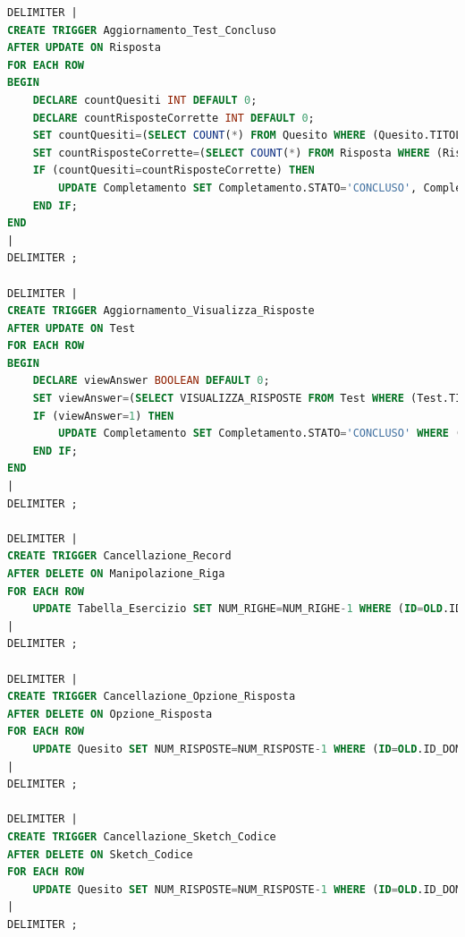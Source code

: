 \documentclass{article}
\begin{document}
\begin{lstlisting}[language=SQL, title=Codice SQL completo dei trigger dello schema della basi di dati.]
DELIMITER |
CREATE TRIGGER Aggiornamento_Test_Concluso
AFTER UPDATE ON Risposta
FOR EACH ROW
BEGIN
    DECLARE countQuesiti INT DEFAULT 0;
    DECLARE countRisposteCorrette INT DEFAULT 0;
    SET countQuesiti=(SELECT COUNT(*) FROM Quesito WHERE (Quesito.TITOLO_TEST=NEW.TITOLO_TEST));
    SET countRisposteCorrette=(SELECT COUNT(*) FROM Risposta WHERE (Risposta.TITOLO_TEST=NEW.TITOLO_TEST) AND (Risposta.EMAIL_STUDENTE=NEW.EMAIL_STUDENTE) AND (Risposta.ESITO=1));
    IF (countQuesiti=countRisposteCorrette) THEN 
        UPDATE Completamento SET Completamento.STATO='CONCLUSO', Completamento.DATA_ULTIMARISPOSTA=NOW() WHERE (Completamento.TITOLO_TEST=NEW.TITOLO_TEST) AND (Completamento.EMAIL_STUDENTE=NEW.EMAIL_STUDENTE);
    END IF; 
END
|
DELIMITER ;

DELIMITER |
CREATE TRIGGER Aggiornamento_Visualizza_Risposte
AFTER UPDATE ON Test
FOR EACH ROW
BEGIN
    DECLARE viewAnswer BOOLEAN DEFAULT 0;
    SET viewAnswer=(SELECT VISUALIZZA_RISPOSTE FROM Test WHERE (Test.TITOLO=NEW.TITOLO));
    IF (viewAnswer=1) THEN 
        UPDATE Completamento SET Completamento.STATO='CONCLUSO' WHERE (Completamento.TITOLO_TEST=NEW.TITOLO);
    END IF; 
END
|
DELIMITER ;

DELIMITER |
CREATE TRIGGER Cancellazione_Record
AFTER DELETE ON Manipolazione_Riga
FOR EACH ROW
    UPDATE Tabella_Esercizio SET NUM_RIGHE=NUM_RIGHE-1 WHERE (ID=OLD.ID_TABELLA);
|
DELIMITER ;

DELIMITER |
CREATE TRIGGER Cancellazione_Opzione_Risposta
AFTER DELETE ON Opzione_Risposta
FOR EACH ROW
    UPDATE Quesito SET NUM_RISPOSTE=NUM_RISPOSTE-1 WHERE (ID=OLD.ID_DOMANDA_CHIUSA);
|
DELIMITER ;

DELIMITER |
CREATE TRIGGER Cancellazione_Sketch_Codice
AFTER DELETE ON Sketch_Codice
FOR EACH ROW
    UPDATE Quesito SET NUM_RISPOSTE=NUM_RISPOSTE-1 WHERE (ID=OLD.ID_DOMANDA_CODICE);
|
DELIMITER ;    
\end{lstlisting}
\end{document}
